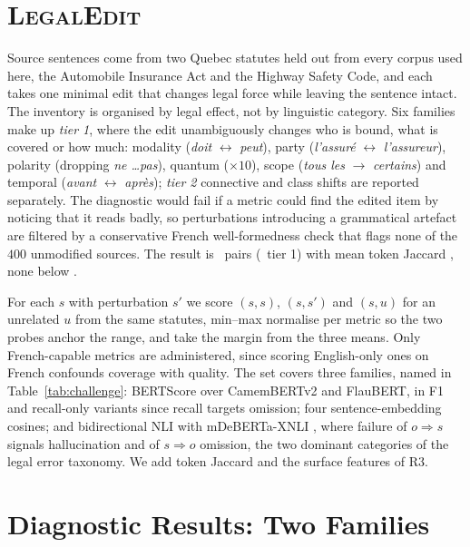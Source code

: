\documentclass[11pt]{article}
\begin{document}
\section{\textsc{LegalEdit}}
\label{sec:legaledit}

Source sentences come from two Quebec statutes held out from every corpus used
here, the Automobile Insurance Act and the Highway Safety Code, and
each takes one minimal edit that changes legal force while leaving the sentence
intact. The inventory is organised by legal effect, not by linguistic category.
Six families make up \emph{tier 1}, where the edit unambiguously changes who is
bound, what is covered or how much: modality (\emph{doit} $\leftrightarrow$
\emph{peut}), party (\emph{l'assur\'e} $\leftrightarrow$ \emph{l'assureur}),
polarity (dropping \emph{ne \dots pas}), quantum ($\times 10$), scope
(\emph{tous les} $\rightarrow$ \emph{certains}) and temporal (\emph{avant}
$\leftrightarrow$ \emph{apr\`es}); \emph{tier 2} connective and class shifts are
reported separately. The diagnostic would fail if a metric could find the edited item by
noticing that it reads badly, so perturbations introducing a grammatical
artefact are filtered by a conservative French well-formedness check that flags
none of the $400$ unmodified sources. The result is \numedits\ pairs
(\numeditsTierOne\ tier 1) with mean token Jaccard \meanjaccard, none below
\minjaccard.

For each $s$ with perturbation $s'$ we score $(s,s)$, $(s,s')$ and $(s,u)$ for
an unrelated $u$ from the same statutes, min--max normalise per metric so the
two probes anchor the range, and take the margin from the three means. Only
French-capable metrics are administered, since scoring English-only ones on
French confounds coverage with quality. The set covers three families, named in
Table~\ref{tab:challenge}: BERTScore
\citep{zhang2019bertscore} over CamemBERTv2 and FlauBERT, in F1 and recall-only
variants since recall targets omission; four sentence-embedding cosines; and
bidirectional NLI with mDeBERTa-XNLI \citep{laurer2024nli}, where failure of
$o \Rightarrow s$ signals hallucination and of $s \Rightarrow o$ omission, the
two dominant categories of the legal error taxonomy. We add token Jaccard and
the surface features of R3.

\section{Diagnostic Results: Two Families}
\label{sec:results}
\end{document}
